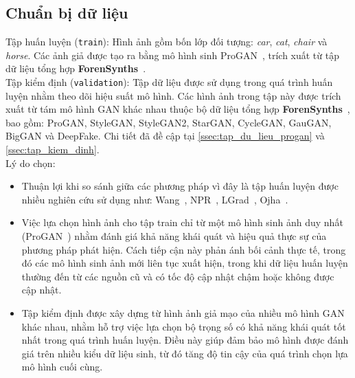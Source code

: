 \subsection{Chuẩn bị dữ liệu}
%
Tập huấn luyện (\texttt{train}): Hình ảnh gồm bốn lớp đối tượng: \textit{car}, \textit{cat}, \textit{chair} và \textit{horse}. Các ảnh giả được tạo ra bằng mô hình sinh ProGAN~\cite{karras2018progressive}, trích xuất từ tập dữ liệu tổng hợp \textbf{ForenSynths}~\cite{Wang2019CNNGeneratedIA}.\\
%
Tập kiểm định (\texttt{validation}):
%
Tập dữ liệu được sử dụng trong quá trình huấn luyện nhằm theo dõi hiệu suất mô hình. Các hình ảnh trong tập này được trích xuất từ tám mô hình GAN khác nhau thuộc bộ dữ liệu tổng hợp \textbf{ForenSynths}~\cite{Wang2019CNNGeneratedIA}, bao gồm: ProGAN, StyleGAN, StyleGAN2, StarGAN, CycleGAN, GauGAN, BigGAN và DeepFake.
%
Chi tiết đã đề cập tại \ref{ssec:tap_du_lieu_progan} và \ref{ssec:tap_kiem_dinh}. \\
%
Lý do chọn:
\begin{itemize}
	\item Thuận lợi khi so sánh giữa các phương pháp vì đây là tập huấn luyện được nhiều nghiên cứu sử dụng như: Wang~\cite{Wang2019CNNGeneratedIA}, NPR~\cite{Tan2023RethinkingTU}, LGrad~\cite{Tan2023LearningOG}, Ojha~\cite{Ojha2023TowardsUF}. 
	\item Việc lựa chọn hình ảnh cho tập \gls{train} chỉ từ một mô hình sinh ảnh duy nhất (ProGAN~\cite{karras2018progressive}) nhằm đánh giá khả năng khái quát và hiệu quả thực sự của phương pháp phát hiện. Cách tiếp cận này phản ánh bối cảnh thực tế, trong đó các mô hình sinh ảnh mới liên tục xuất hiện, trong khi dữ liệu huấn luyện thường đến từ các nguồn cũ và có tốc độ cập nhật chậm hoặc không được cập nhật.
	\item Tập kiểm định được xây dựng từ hình ảnh giả mạo của nhiều mô hình GAN khác nhau, nhằm hỗ trợ việc lựa chọn bộ trọng số có khả năng khái quát tốt nhất trong quá trình huấn luyện. Điều này giúp đảm bảo mô hình được đánh giá trên nhiều kiểu dữ liệu sinh, từ đó tăng độ tin cậy của quá trình chọn lựa mô hình cuối cùng.
\end{itemize}
%
